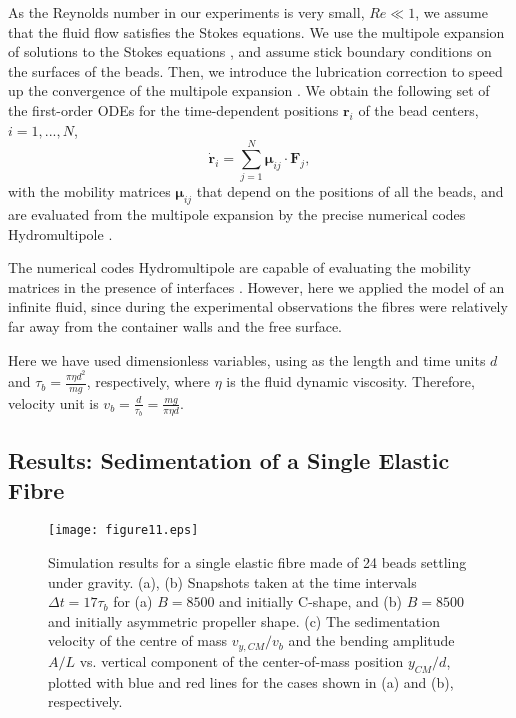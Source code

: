 \documentclass{article}
\begin{document}
As the Reynolds number in our experiments is %
very small, $Re \ll 1$, %
we assume that the fluid flow satisfies the Stokes equations. We use the multipole expansion of solutions to the Stokes equations \cite{kim,cichocki1994}, and assume stick boundary conditions on the surfaces of the beads. Then, we introduce the lubrication correction to speed up the convergence of the multipole expansion \cite{durlofsky,cichocki_lubrication_1999}. We obtain the following  set of the first-order ODEs for the time-dependent positions $\bm{r}_i$ of the bead centers, $i=1,...,N$, 
\begin{equation}
\dot{\bm{r}}_{i} = \sum_{j=1}^{N} \bm{\mu}_{ij} \cdot \bm{F}_j, %
\end{equation}
with the mobility matrices $\bm{\mu}_{ij}$ that depend on the positions of all the beads, and are evaluated from the multipole expansion by the precise numerical codes Hydromultipole \cite{cichocki_lubrication_1999,ekiel-jezewska_precise_2009}.

The numerical codes Hydromultipole are capable of evaluating the mobility matrices in the presence of interfaces \cite{cichocki_friction_2000,cichocki2004motion,cichocki2007hydrodynamic,bhattacharya_many-particle_2005,bhattacharya2005hydrodynamic,blawzdziewicz2010motion}. However, here we applied the model of an infinite fluid, since during the experimental observations the fibres were relatively far away from the container walls and the free surface.


Here we have used dimensionless variables, using as the length and time units 
$d$ and $\tau_b = \frac{\pi \eta d^2}{mg}$, respectively, where $\eta$ is the fluid dynamic viscosity. Therefore, velocity unit is
$v_b = \frac{d}{\tau_b} = \frac{mg}{\pi \eta d}$. %


\subsection{Results: Sedimentation of a Single Elastic Fibre}

\begin{figure*}[t!]
    \centering
    \texttt{[image: figure11.eps]}
    \caption{Simulation results for a single elastic fibre made of 24 beads  settling under gravity. (a), (b) 
    Snapshots taken %
    at the %
    time intervals 
    $\Delta t = 17 \tau_b$ 
    for %
    (a) $B=8500$ and initially C-shape, and
    (b) $B=8500$ and initially asymmetric propeller shape.
    (c) The sedimentation velocity of the centre of mass $v_{y,CM}/v_b$ and the bending amplitude $A/L$ vs. vertical component of the center-of-mass position $y_{CM}/d$, %
    plotted with blue and red lines for the cases shown in (a) and (b), respectively.
    }
    \label{fig:figure_simulations_24}
\end{figure*}
\end{document}
